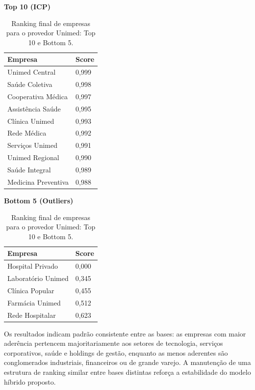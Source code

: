 \begin{table}[p]
    \centering
    \caption{Ranking final de empresas para o provedor Unimed: Top 10 e Bottom 5.}
    \label{tab:7_6_ranking_unimed}
    \begin{minipage}{0.48\textwidth}
    \centering
    \textbf{Top 10 (ICP)}\\
    \begin{tabular}{p{5cm}p{1.8cm}}
    \toprule
    Empresa & Score \\
    \midrule
    Unimed Central & 0,999 \\
    Saúde Coletiva & 0,998 \\
    Cooperativa Médica & 0,997 \\
    Assistência Saúde & 0,995 \\
    Clínica Unimed & 0,993 \\
    Rede Médica & 0,992 \\
    Serviços Unimed & 0,991 \\
    Unimed Regional & 0,990 \\
    Saúde Integral & 0,989 \\
    Medicina Preventiva & 0,988 \\
    \bottomrule
    \end{tabular}
    \end{minipage}\hfill
    \begin{minipage}{0.48\textwidth}
    \centering
    \textbf{Bottom 5 (Outliers)}\\
    \begin{tabular}{p{5cm}p{1.8cm}}
    \toprule
    Empresa & Score \\
    \midrule
    Hospital Privado & 0,000 \\
    Laboratório Unimed & 0,345 \\
    Clínica Popular & 0,455 \\
    Farmácia Unimed & 0,512 \\
    Rede Hospitalar & 0,623 \\
    \bottomrule
    \end{tabular}
    \end{minipage}
\end{table}

Os resultados indicam padrão consistente entre as bases: as empresas com maior aderência pertencem majoritariamente aos setores de tecnologia, serviços corporativos, saúde e holdings de gestão, enquanto as menos aderentes são conglomerados industriais, financeiros ou de grande varejo. A manutenção de uma estrutura de ranking similar entre bases distintas reforça a estabilidade do modelo híbrido proposto.

